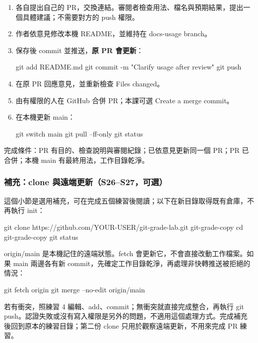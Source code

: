 \documentclass[11pt,a4paper]{article}
\DeclareRobustCommand{\code}[1]{{\small\ttfamily #1}}
\begin{document}
\begin{enumerate}
    \item 各自提出自己的 PR，交換連結。審閱者檢查用法、檔名與預期結果，提出一個具體建議；不需要對方的 \code{push} 權限。
    \item 作者依意見修改本機 README，並維持在 \code{docs-usage} branch。
    \item 保存後 commit 並推送，\textbf{原 PR 會更新}：
\begin{Code}
git add README.md
git commit -m "Clarify usage after review"
git push
\end{Code}
    \item 在原 PR 回應意見，並重新檢查 Files changed。
    \item 由有權限的人在 GitHub 合併 PR；本課可選 Create a merge commit。
    \item 在本機更新 \code{main}：
\begin{Code}
git switch main
git pull --ff-only
git status
\end{Code}
\end{enumerate}

完成條件：PR 有目的、檢查說明與審閱紀錄；已依意見更新同一個 PR；PR 已合併；本機 \code{main} 有最終用法，工作目錄乾淨。

\subsubsection{補充：\code{clone} 與遠端更新（S26–S27，可選）}

這個小節是選用補充，可在完成五個練習後閱讀；以下在新目錄取得既有倉庫，不再執行 \code{init}：

\begin{Code}
git clone https://github.com/YOUR-USER/git-grade-lab.git git-grade-copy
cd git-grade-copy
git status
\end{Code}

\code{origin/main} 是本機記住的遠端狀態。\code{fetch} 會更新它，不會直接改動工作檔案。如果 \code{main} 兩邊各有新 commit，先確定工作目錄乾淨，再處理非快轉推送被拒絕的情況：

\begin{Code}
git fetch origin
git merge --no-edit origin/main
\end{Code}

若有衝突，照練習 4 編輯、\code{add}、\code{commit}；無衝突就直接完成整合，再執行 \code{git push}。認證失敗或沒有寫入權限是另外的問題，不適用這個處理方式。完成補充後回到原本的練習目錄；第二份 \code{clone} 只用於觀察遠端更新，不用來完成 PR 練習。
\end{document}
